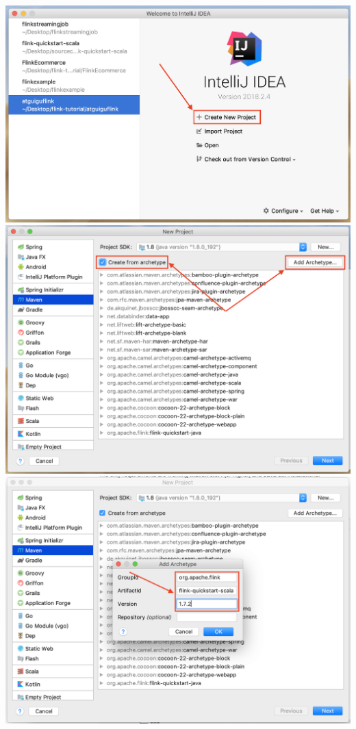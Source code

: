 \documentclass[oneside]{ctexbook}
\begin{document}
\noindent \includegraphics[width=\textwidth]{quickstart1.png}
\noindent \includegraphics[width=\textwidth]{quickstart2.png}
\noindent \includegraphics[width=\textwidth]{quickstart3.png}
\end{document}
